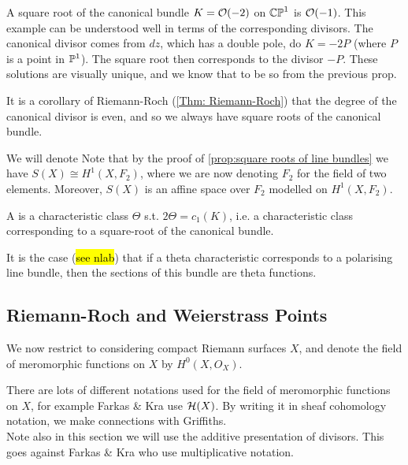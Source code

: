 \documentclass{article}
\begin{document}
\begin{example}
	A square root of the canonical bundle $K=\mathcal{O}(-2)$ on $\mathbb{CP}^1$ is $\mathcal{O}(-1)$. This example can be understood well in terms of the corresponding divisors. The canonical divisor comes from $dz$, which has a double pole, do $K=-2P$ (where $P$ is a point in $\mathbb{P}^1$). The square root then corresponds to the divisor $-P$. These solutions are visually unique, and we know that to be so from the previous prop.  
\end{example}

\begin{remark}
	It is a corollary of Riemann-Roch (\ref{Thm: Riemann-Roch}) that the degree of the canonical divisor is even, and so we always have square roots of the canonical bundle. 
\end{remark}
\begin{notation}
	We will denote
Note that by the proof of \ref{prop:square roots of line bundles} we have $S(X) \cong H^1(X,F_2)$, where we are now denoting $F_2$ for the field of two elements. Moreover, $S(X)$ is an affine space over $F_2$ modelled on $H^1(X,F_2)$. 
\end{notation}

\begin{definition}
	A  is a characteristic class $\Theta$ s.t. $2\Theta = c_1(K)$, i.e. a characteristic class corresponding to a square-root of the canonical bundle. 
\end{definition}

\begin{remark}
	It is the case (\hl{see nlab}) that if a theta characteristic corresponds to a polarising line bundle, then the sections of this bundle are theta functions. 
\end{remark}
\subsection{Riemann-Roch and Weierstrass Points}
We now restrict to considering compact Riemann surfaces $X$, and denote the field of meromorphic functions on $X$ by $H^0(X,O_X)$.
\begin{remark}
	There are lots of different notations used for the field of meromorphic functions on $X$, for example Farkas \& Kra use $\mathcal{H}(X)$. By writing it in sheaf cohomology notation, we make connections with Griffiths. \\
	Note also in this section we will use the additive presentation of divisors. This goes against Farkas \& Kra who use multiplicative notation.
\end{remark}
\end{document}
